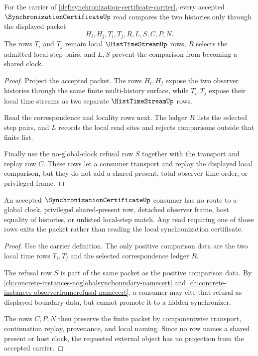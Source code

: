 \begin{theorem}
\label{thm:synchronization-certificate-locality}
For the carrier of \autoref{def:synchronization-certificate-carrier}, every accepted $\SynchronizationCertificateUp$ read compares the two histories only through the displayed packet
$$
H_i,H_j,T_i,T_j,R,L,S,C,P,N.
$$
The rows $T_i$ and $T_j$ remain local $\HistTimeStreamUp$ rows, $R$ selects the admitted local-step pairs, and $L,S$ prevent the comparison from becoming a shared clock.
\end{theorem}
\begin{proof}
Project the accepted packet. The rows $H_i,H_j$ expose the two observer histories through the same finite multi-history surface, while $T_i,T_j$ expose their local time streams as two separate $\HistTimeStreamUp$ rows.

Read the correspondence and locality rows next. The ledger $R$ lists the selected step pairs, and $L$ records the local read sites and rejects comparisons outside that finite list.

Finally use the no-global-clock refusal row $S$ together with the transport and replay row $C$. These rows let a consumer transport and replay the displayed local comparison, but they do not add a shared present, total observer-time order, or privileged frame.
\end{proof}

\begin{theorem}
\label{thm:synchronization-certificate-nonescape}
An accepted $\SynchronizationCertificateUp$ consumer has no route to a global clock, privileged shared-present row, detached observer frame, host equality of histories, or unlisted local-step match. Any read requiring one of those rows exits the packet rather than reading the local synchronization certificate.
\end{theorem}
\begin{proof}
Use the carrier definition. The only positive comparison data are the two local time rows $T_i,T_j$ and the selected correspondence ledger $R$.

The refusal row $S$ is part of the same packet as the positive comparison data. By \autoref{ch:concrete-instances-noglobalsyncboundary-namecert} and \autoref{ch:concrete-instances-observerframerefusal-namecert}, a consumer may cite that refusal as displayed boundary data, but cannot promote it to a hidden synchronizer.

The rows $C,P,N$ then preserve the finite packet by componentwise transport, continuation replay, provenance, and local naming. Since no row names a shared present or host clock, the requested external object has no projection from the accepted carrier.
\end{proof}

